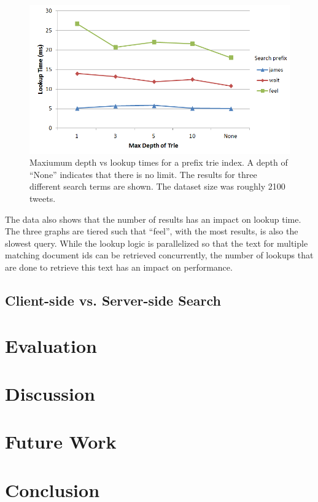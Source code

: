 \documentclass{vldb}
\begin{document}
\begin{figure}[h!]
   \includegraphics[scale=.43]{trie_maxdepth_graph}
  \caption{Maxiumum depth vs lookup times for a prefix trie index. A depth of ``None'' indicates that there is no limit. The results for three different search terms are shown. The dataset size was roughly 2100 tweets.}
\end{figure}

The data also shows that the number of results has an  impact on lookup time. The three graphs are tiered such that ``feel'', with the most results, is also the slowest query. While the lookup logic is parallelized so that the text for multiple matching document ids can be retrieved concurrently, the number of lookups that are done to retrieve this text has an impact on performance.

\subsection{Client-side vs. Server-side Search}

\section{Evaluation}




\section{Discussion}

\section{Future Work}

\section{Conclusion}



\end{document}
